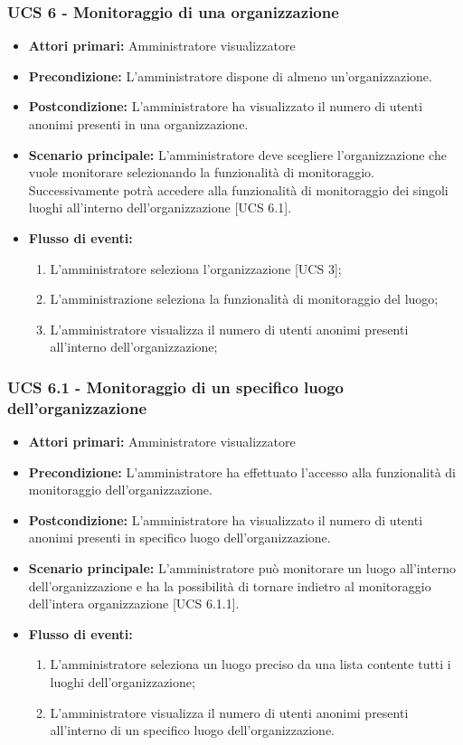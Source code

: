 

\subsubsection{UCS 6 - Monitoraggio di una organizzazione}
\begin{itemize}
	\item \textbf{Attori primari:} Amministratore visualizzatore
	\item \textbf{Precondizione:} L'amministratore dispone di almeno un'organizzazione.
	\item \textbf{Postcondizione:} L'amministratore ha visualizzato il numero di utenti anonimi presenti in una organizzazione.
	\item \textbf{Scenario principale:} L'amministratore deve scegliere l'organizzazione che vuole monitorare selezionando la funzionalità di monitoraggio. Successivamente potrà accedere alla funzionalità di monitoraggio dei singoli luoghi all'interno dell'organizzazione [UCS 6.1].
	\item \textbf{Flusso di eventi:}
\begin{enumerate}
	\item L'amministratore seleziona l'organizzazione [UCS 3]; 
	\item L'amministrazione seleziona la funzionalità di monitoraggio del luogo;
	\item L'amministratore visualizza il numero di utenti anonimi presenti all'interno dell'organizzazione;
\end{enumerate}
\end{itemize}

\subsubsection{UCS 6.1 - Monitoraggio di un specifico luogo dell'organizzazione}
\begin{itemize}
	\item \textbf{Attori primari:} Amministratore visualizzatore
	\item \textbf{Precondizione:} L'amministratore ha effettuato l'accesso alla funzionalità di monitoraggio dell'organizzazione.
	\item \textbf{Postcondizione:} L'amministratore ha visualizzato il numero di utenti anonimi presenti in specifico luogo dell'organizzazione.
	\item \textbf{Scenario principale:} L'amministratore può monitorare un luogo all'interno dell'organizzazione e ha la possibilità di tornare indietro al monitoraggio dell'intera organizzazione [UCS 6.1.1].
	\item \textbf{Flusso di eventi:}
	\begin{enumerate}
	\item L'amministratore seleziona un luogo preciso da una lista contente tutti i luoghi dell'organizzazione;
	\item L'amministratore visualizza il numero di utenti anonimi presenti all'interno di un specifico luogo dell'organizzazione.
	\end{enumerate}
\end{itemize}


